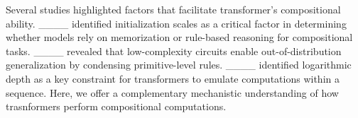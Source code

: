 Several studies highlighted factors that facilitate transformer's compositional ability. ____ identified initialization scales as a critical factor in determining whether models rely on memorization or rule-based reasoning for compositional tasks. ____ revealed that low-complexity circuits enable out-of-distribution generalization by condensing primitive-level rules. ____ identified logarithmic depth as a key constraint for transformers to emulate computations within a sequence. Here, we offer a complementary mechanistic understanding of how trasnformers perform compositional computations.